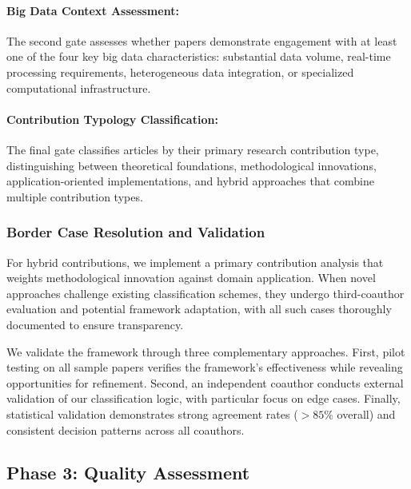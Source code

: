 \documentclass[acmsmall]{acmart}
\begin{document}
\paragraph{Big Data Context Assessment:}
The second gate assesses whether papers demonstrate engagement with at least one of the four key big data characteristics: substantial data volume, real-time processing requirements, heterogeneous data integration, or specialized computational infrastructure.

\paragraph{Contribution Typology Classification:}
The final gate classifies articles by their primary research contribution type, distinguishing between theoretical foundations, methodological innovations, application-oriented implementations, and hybrid approaches that combine multiple contribution types.

\subsubsection{Border Case Resolution and Validation}\label{subsubsec:phase-2-literature-search-and-study-selection:border-case-resolution-and-validation}
For hybrid contributions, we implement a primary contribution analysis that weights methodological innovation against domain application. When novel approaches challenge existing classification schemes, they undergo third-coauthor evaluation and potential framework adaptation, with all such cases thoroughly documented to ensure transparency.

We validate the framework through three complementary approaches. First, pilot testing on all sample papers verifies the framework's effectiveness while revealing opportunities for refinement. Second, an independent coauthor conducts external validation of our classification logic, with particular focus on edge cases. Finally, statistical validation demonstrates strong agreement rates ($> 85\%$ overall) and consistent decision patterns across all coauthors.

\subsection{Phase 3: Quality Assessment}\label{subsec:phase-3-quality-assessment}
\end{document}
